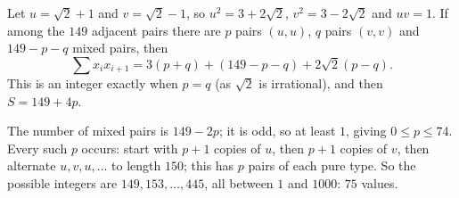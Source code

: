 Let $u=\sqrt2+1$ and $v=\sqrt2-1$, so $u^2=3+2\sqrt2$, $v^2=3-2\sqrt2$ and $uv=1$. If among the $149$ adjacent pairs there are $p$ pairs $(u,u)$, $q$ pairs $(v,v)$ and $149-p-q$ mixed pairs, then
\[\sum x_ix_{i+1}=3(p+q)+(149-p-q)+2\sqrt2(p-q).\]
This is an integer exactly when $p=q$ (as $\sqrt2$ is irrational), and then $S=149+4p$.

The number of mixed pairs is $149-2p$; it is odd, so at least $1$, giving $0\le p\le74$. Every such $p$ occurs: start with $p+1$ copies of $u$, then $p+1$ copies of $v$, then alternate $u,v,u,\dots$ to length $150$; this has $p$ pairs of each pure type. So the possible integers are $149,153,\dots,445$, all between $1$ and $1000$: $\boxed{75}$ values.
